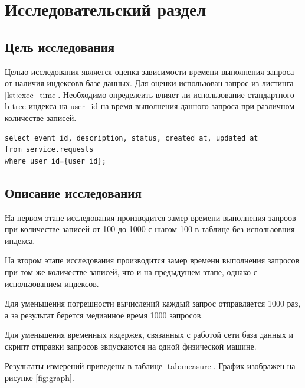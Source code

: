 \section{Исследовательский раздел} \label{research}

\subsection{Цель исследования}

Целью исследования является оценка зависимости времени выполнения запроса от наличия индексовв базе данных. Для оценки использован запрос из листинга \ref{lst:exec_time}. Необходимо определеить влияет ли использование стандартного b-tree индекса на user{\_}id  на время выполнения данного запроса при различном количестве записей.

\begin{lstlisting}[label=lst:exec_time, caption=Запрос для исследования]
select event_id, description, status, created_at, updated_at
from service.requests
where user_id={user_id};
\end{lstlisting}

\subsection{Описание исследования}

На первом этапе исследования производится замер времени выполнения запроов при количестве записей от 100 до 1000 с шагом 100 в таблице без использовния индекса.

На втором этапе исследования производится замер времени выполнения запросов при том же количестве записей, что и на предыдущем этапе, однако с использованием индексов.

Для уменьшения погрешности вычислений каждый запрос отправляется 1000 раз, а за результат берется медианное время 1000 запросов.

Для уменьшения временных издержек, связанных с работой сети база данных и скрипт отправки запросов звпускаются на одной физической машине.

Результаты измерений приведены в таблице \ref{tab:measure}. График изображен на рисунке \ref{fig:graph}.

\pagebreak

